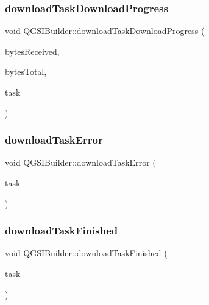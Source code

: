 \subsubsection{\texorpdfstring{download\+Task\+Download\+Progress}{downloadTaskDownloadProgress}}
{\footnotesize\ttfamily void Q\+G\+S\+I\+Builder\+::download\+Task\+Download\+Progress (\begin{DoxyParamCaption}\item[{qint64}]{bytes\+Received,  }\item[{qint64}]{bytes\+Total,  }\item[{\mbox{\hyperlink{class_q_g_s_download_task}{Q\+G\+S\+Download\+Task}} $\ast$}]{task }\end{DoxyParamCaption})\hspace{0.3cm}{\ttfamily [signal]}}

\mbox{\label{class_q_g_s_i_builder_ac1d135bb45a9ecf1dc7a1cd16074415c}} 
\subsubsection{\texorpdfstring{download\+Task\+Error}{downloadTaskError}}
{\footnotesize\ttfamily void Q\+G\+S\+I\+Builder\+::download\+Task\+Error (\begin{DoxyParamCaption}\item[{\mbox{\hyperlink{class_q_g_s_download_task}{Q\+G\+S\+Download\+Task}} $\ast$}]{task }\end{DoxyParamCaption})\hspace{0.3cm}{\ttfamily [signal]}}

\mbox{\label{class_q_g_s_i_builder_acb9d50b1936cf4d2217229f0aecc2283}} 
\subsubsection{\texorpdfstring{download\+Task\+Finished}{downloadTaskFinished}}
{\footnotesize\ttfamily void Q\+G\+S\+I\+Builder\+::download\+Task\+Finished (\begin{DoxyParamCaption}\item[{\mbox{\hyperlink{class_q_g_s_download_task}{Q\+G\+S\+Download\+Task}} $\ast$}]{task }\end{DoxyParamCaption})\hspace{0.3cm}{\ttfamily [signal]}}

